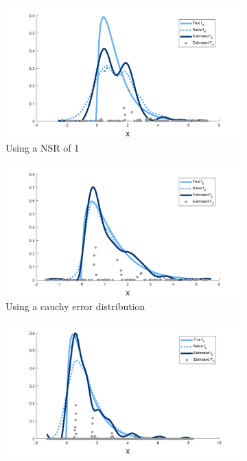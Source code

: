 \begin{figure}
	\begin{subfigure}[b]{0.49\textwidth}
		\centering
		\includegraphics[width = \textwidth]{Figures/Deconvolution/fixed_masses_example_NSR1.png}
		\caption{Using a NSR of 1}
		\label{fig:fixed masses example NSR1}
	\end{subfigure}
	\hfill
	\begin{subfigure}[b]{0.49\textwidth}
		\centering
		\includegraphics[width = \textwidth]{Figures/Deconvolution/fixed_masses_example_Ucauchy.png}
		\caption{Using a cauchy error distribution}
		\label{fig:fixed masses example Ucauchy}
	\end{subfigure}
	\begin{subfigure}[b]{0.49\textwidth}
		\centering
		\includegraphics[width = \textwidth]{Figures/Deconvolution/fixed_masses_example_n10000.png}

\end{subfigure}
\end{figure}
